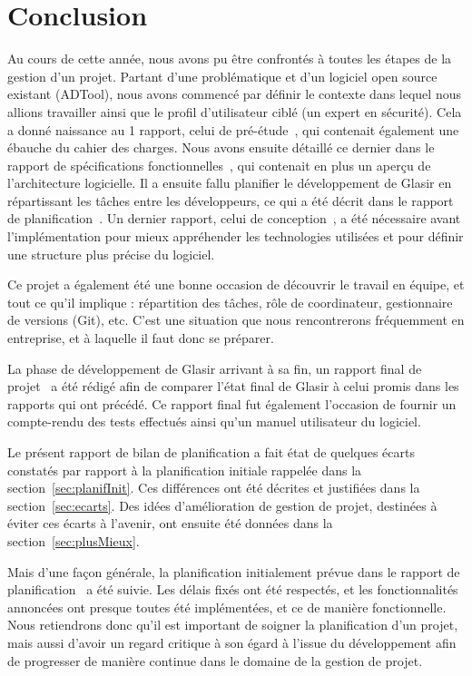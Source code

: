 \section{Conclusion}
\label{sec:conclu}

Au cours de cette année, nous avons pu être confrontés à toutes les étapes de la gestion d'un projet. Partant d'une problématique et d'un logiciel open source existant (ADTool), nous avons commencé par définir le contexte dans lequel nous allions travailler ainsi que le profil d'utilisateur ciblé (un expert en sécurité). Cela a donné naissance au 1\ier{} rapport, celui de pré-étude~\cite{pre_etude}, qui contenait également une ébauche du cahier des charges. Nous avons ensuite détaillé ce dernier dans le rapport de spécifications fonctionnelles~\cite{spec_fonc}, qui contenait en plus un aperçu de l'architecture logicielle. Il a ensuite fallu planifier le développement de Glasir en répartissant les tâches entre les développeurs, ce qui a été décrit dans le rapport de planification~\cite{planif}. Un dernier rapport, celui de conception~\cite{conception}, a été nécessaire avant l'implémentation pour mieux appréhender les technologies utilisées et pour définir une structure plus précise du logiciel.

Ce projet a également été une bonne occasion de découvrir le travail en équipe, et tout ce qu'il implique : répartition des tâches, rôle de coordinateur, gestionnaire de versions (Git), etc. C'est une situation que nous rencontrerons fréquemment en entreprise, et à laquelle il faut donc se préparer.

La phase de développement de Glasir arrivant à sa fin, un rapport final de projet~\cite{rapportFinal} a été rédigé afin de comparer l'état final de Glasir à celui promis dans les rapports qui ont précédé. Ce rapport final fut également l'occasion de fournir un compte-rendu des tests effectués ainsi qu'un manuel utilisateur du logiciel.

Le présent rapport de bilan de planification a fait état de quelques écarts constatés par rapport à la planification initiale rappelée dans la {\sc section}~\ref{sec:planifInit}. Ces différences ont été décrites et justifiées dans la {\sc section}~\ref{sec:ecarts}. Des idées d'amélioration de gestion de projet, destinées à éviter ces écarts à l'avenir, ont ensuite été données dans la {\sc section}~\ref{sec:plusMieux}.

Mais d'une façon générale, la planification initialement prévue dans le rapport de planification~\cite{planif} a été suivie. Les délais fixés ont été respectés, et les fonctionnalités annoncées ont presque toutes été implémentées, et ce de manière fonctionnelle. Nous retiendrons donc qu'il est important de soigner la planification d'un projet, mais aussi d'avoir un regard critique à son égard à l'issue du développement afin de progresser de manière continue dans le domaine de la gestion de projet.